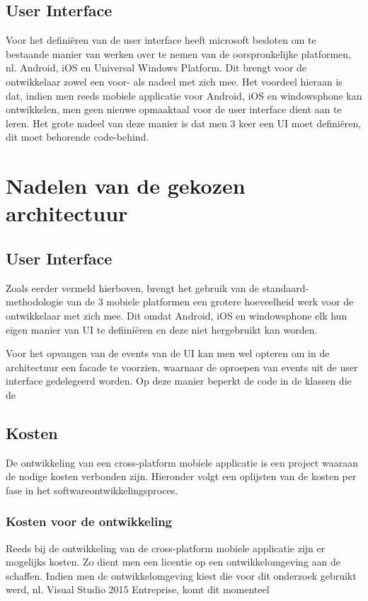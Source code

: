 \subsection{User Interface}
Voor het definiëren van de user interface heeft microsoft besloten om te bestaande manier van werken over te nemen van de oorspronkelijke platformen, nl. Android, iOS en Universal Windows Platform.
Dit brengt voor de ontwikkelaar zowel een voor- als nadeel met zich mee. Het voordeel hieraan is dat, indien men reeds mobiele applicatie voor Android, iOS en windowsphone kan ontwikkelen, men geen
nieuwe opmaaktaal voor de user interface dient aan te leren. Het grote nadeel van deze manier is dat men 3 keer een UI moet definiëren,
dit moet behorende code-behind.

\label{sec:nadelenvandegekozenapparchitectuur}
\section{Nadelen van de gekozen architectuur}
\subsection{User Interface}
Zoals eerder vermeld hierboven, brengt het gebruik van de standaard-methodologie van de 3 mobiele platformen een grotere hoeveelheid
werk voor de ontwikkelaar met zich mee. Dit omdat Android, iOS en windowsphone elk hun eigen manier van UI te defiiniëren en deze niet hergebruikt kan worden.

Voor het opvangen van de events van de UI kan men wel opteren om in de architectuur een facade te voorzien, waarnaar de oproepen van events uit de user interface gedelegeerd worden.
Op deze manier beperkt de code in de klassen die de 
\label{sec:appkosten}
\subsection{Kosten}
De ontwikkeling van een cross-platform mobiele applicatie is een project waaraan de nodige kosten verbonden zijn.
Hieronder volgt een oplijsten van de kosten per fase in het softwareontwikkelingsproces.

\subsubsection{Kosten voor de ontwikkeling}
Reeds bij de ontwikkeling van de cross-platform mobiele applicatie zijn er mogelijks kosten. Zo dient men een licentie op een ontwikkelomgeving
aan de schaffen. Indien men de ontwikkelomgeving kiest die voor dit onderzoek gebruikt werd, nl. Visual Studio 2015 Entreprise, komt dit momenteel

